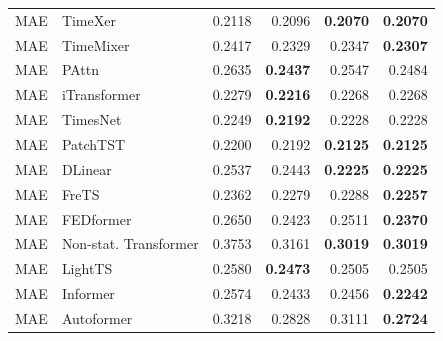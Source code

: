 \begin{longtable}{llrrrr}
\midrule
MAE & TimeXer & 0.2118 & 0.2096 & \textbf{0.2070} & \textbf{0.2070} \\
MAE & TimeMixer & 0.2417 & 0.2329 & 0.2347 & \textbf{0.2307} \\
MAE & PAttn & 0.2635 & \textbf{0.2437} & 0.2547 & 0.2484 \\
MAE & iTransformer & 0.2279 & \textbf{0.2216} & 0.2268 & 0.2268 \\
MAE & TimesNet & 0.2249 & \textbf{0.2192} & 0.2228 & 0.2228 \\
MAE & PatchTST & 0.2200 & 0.2192 & \textbf{0.2125} & \textbf{0.2125} \\
MAE & DLinear & 0.2537 & 0.2443 & \textbf{0.2225} & \textbf{0.2225} \\
MAE & FreTS & 0.2362 & 0.2279 & 0.2288 & \textbf{0.2257} \\
MAE & FEDformer & 0.2650 & 0.2423 & 0.2511 & \textbf{0.2370} \\
MAE & Non-stat. Transformer & 0.3753 & 0.3161 & \textbf{0.3019} & \textbf{0.3019} \\
MAE & LightTS & 0.2580 & \textbf{0.2473} & 0.2505 & 0.2505 \\
MAE & Informer & 0.2574 & 0.2433 & 0.2456 & \textbf{0.2242} \\
MAE & Autoformer & 0.3218 & 0.2828 & 0.3111 & \textbf{0.2724} \\
\end{longtable}
\endgroup

